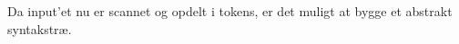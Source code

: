 \noindent Da input'et nu er scannet og opdelt i tokens, er det muligt at bygge et abstrakt syntakstræ.





